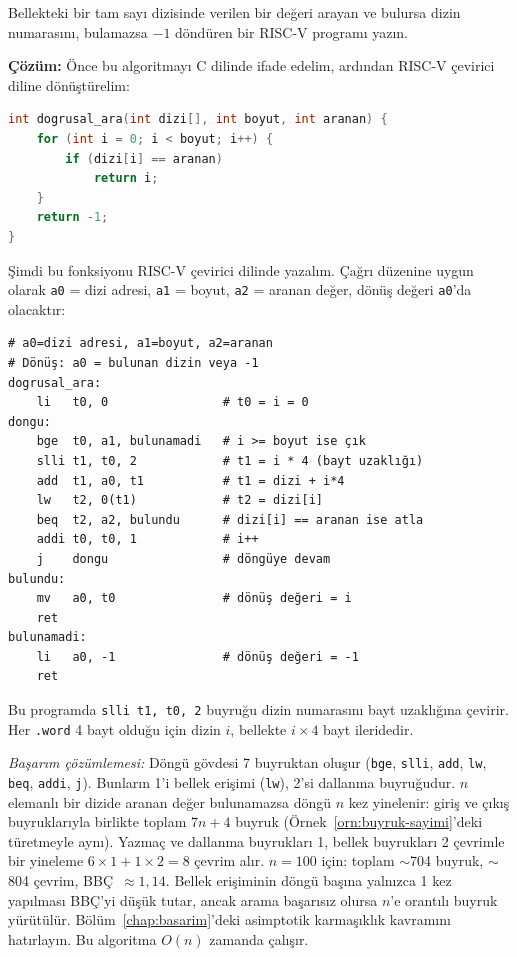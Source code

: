 \begin{ornek}[4.7]
\label{orn:dogrusal-arama}
Bellekteki bir tam sayı dizisinde verilen bir değeri arayan ve bulursa dizin numarasını, bulamazsa $-1$ döndüren bir RISC-V programı yazın.

\textbf{Çözüm:} Önce bu algoritmayı C dilinde ifade edelim, ardından RISC-V çevirici diline dönüştürelim:

\begin{lstlisting}[language=C, style=alistirma-kod]
int dogrusal_ara(int dizi[], int boyut, int aranan) {
    for (int i = 0; i < boyut; i++) {
        if (dizi[i] == aranan)
            return i;
    }
    return -1;
}
\end{lstlisting}

Şimdi bu fonksiyonu RISC-V çevirici dilinde yazalım. Çağrı düzenine uygun olarak \texttt{a0} = dizi adresi, \texttt{a1} = boyut, \texttt{a2} = aranan değer, dönüş değeri \texttt{a0}'da olacaktır:

\begin{lstlisting}[style=riscv]
# a0=dizi adresi, a1=boyut, a2=aranan
# Dönüş: a0 = bulunan dizin veya -1
dogrusal_ara:
    li   t0, 0                # t0 = i = 0
dongu:
    bge  t0, a1, bulunamadi   # i >= boyut ise çık
    slli t1, t0, 2            # t1 = i * 4 (bayt uzaklığı)
    add  t1, a0, t1           # t1 = dizi + i*4
    lw   t2, 0(t1)            # t2 = dizi[i]
    beq  t2, a2, bulundu      # dizi[i] == aranan ise atla
    addi t0, t0, 1            # i++
    j    dongu                # döngüye devam
bulundu:
    mv   a0, t0               # dönüş değeri = i
    ret
bulunamadi:
    li   a0, -1               # dönüş değeri = -1
    ret
\end{lstlisting}

Bu programda \texttt{slli t1, t0, 2} buyruğu dizin numarasını bayt uzaklığına çevirir. Her \texttt{.word} 4 bayt olduğu için dizin $i$, bellekte $i \times 4$ bayt ileridedir.

\emph{Başarım çözümlemesi:} Döngü gövdesi 7 buyruktan oluşur (\texttt{bge}, \texttt{slli}, \texttt{add}, \texttt{lw}, \texttt{beq}, \texttt{addi}, \texttt{j}). Bunların 1'i bellek erişimi (\texttt{lw}), 2'si dallanma buyruğudur. $n$ elemanlı bir dizide aranan değer bulunamazsa döngü $n$ kez yinelenir: giriş ve çıkış buyruklarıyla birlikte toplam $7n + 4$ buyruk (Örnek~\ref{orn:buyruk-sayimi}'deki türetmeyle aynı). Yazmaç ve dallanma buyrukları 1, bellek buyrukları 2 çevrimle bir yineleme $6 \times 1 + 1 \times 2 = 8$ çevrim alır. $n = 100$ için: toplam $\sim$704 buyruk, $\sim$804 çevrim, BBÇ~$\approx 1{,}14$. Bellek erişiminin döngü başına yalnızca 1 kez yapılması BBÇ'yi düşük tutar, ancak arama başarısız olursa $n$'e orantılı buyruk yürütülür. Bölüm~\ref{chap:basarim}'deki asimptotik karmaşıklık kavramını hatırlayın. Bu algoritma $O(n)$ zamanda çalışır.
\end{ornek}


